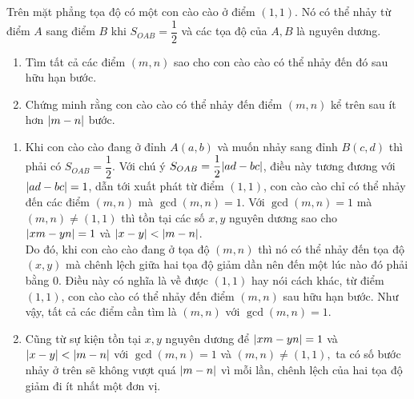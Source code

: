 \begin{bt}
	Trên mặt phẳng tọa độ có một con cào cào ở điểm $(1,1)$. Nó có thể nhảy từ điểm $A$ sang điểm $B$ khi $S_{OAB}=\dfrac{1}{2}$ và các tọa độ của $A,B$ là nguyên dương.
	\begin{enumerate}
		\item Tìm tất cả các điểm $(m,n)$ sao cho con cào cào có thể nhảy đến đó sau hữu hạn bước.
		\item Chứng minh rằng con cào cào có thể nhảy đến điểm $(m,n)$ kể trên sau ít hơn $\arrowvert m-n \arrowvert$ bước.
	\end{enumerate}  
	\begin{enumerate}
		\item Khi con cào cào đang ở đỉnh $A(a,b)$ và muốn nhảy sang đỉnh $B(c,d)$ thì phải có $S_{OAB}=\dfrac{1}{2}$. Với chú ý $S_{OAB}=\dfrac{1}{2} \arrowvert ad-bc \arrowvert$, điều này tương đương với $\arrowvert ad-bc \arrowvert =1$, dẫn tới xuất phát từ điểm $(1,1)$, con cào cào chỉ có thể nhảy đến các điểm $(m,n)$ mà $\gcd(m,n)=1$.
		Với $\gcd(m,n)=1$ mà $(m,n) \ne (1,1)$ thì tồn tại các số $x,y$ nguyên dương sao cho $\arrowvert xm-yn \arrowvert =1$ và $\arrowvert x-y \arrowvert < \arrowvert m-n \arrowvert $.\\
		Do đó, khi con cào cào đang ở tọa độ $(m,n)$ thì nó có thể nhảy đến tọa độ $(x,y)$ mà chênh lệch giữa hai tọa độ giảm dần nên đến một lúc nào đó phải bằng $0$. Điều này có nghĩa là về được $(1,1)$ hay nói cách khác, từ điểm $(1,1)$, con cào cào có thể nhảy đến điểm $(m,n)$ sau hữu hạn bước. Như vậy, tất cả các điểm cần tìm là $(m,n)$ với $\gcd(m,n)=1$.
		\item Cũng từ sự kiện tồn tại $x,y$ nguyên dương để $\arrowvert xm-yn \arrowvert =1$ và $\arrowvert x-y \arrowvert < \arrowvert m-n \arrowvert $ với $\gcd(m,n)=1$ và $(m,n) \ne (1,1),$ ta có số bước nhảy ở trên sẽ không vượt quá $\arrowvert m-n \arrowvert $ vì mỗi lần, chênh lệch của hai tọa độ giảm đi ít nhất một đơn vị.
	\end{enumerate}
\end{bt}

